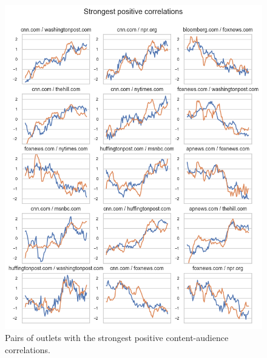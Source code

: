 \documentclass{scrartcl}
\begin{document}
\begin{figure}[H]
  \centering
  \includegraphics[height=0.6\textheight]{figures/ts-ca-pos-corrs.png}
  \caption{Pairs of outlets with the strongest positive content-audience correlations.}
\end{figure}
\end{document}
